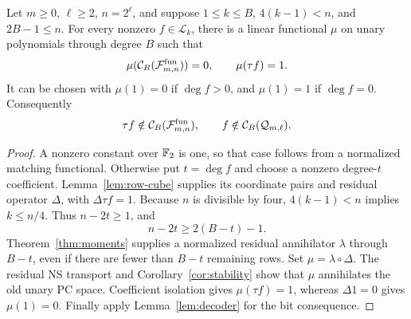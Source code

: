 \begin{theorem}
\label{thm:row-separation}
Let \(m\ge0\), \(\ell\ge2\), \(n=2^\ell\), and suppose
\(1\le k\le B\), \(4(k-1)<n\), and \(2B-1\le n\).
For every nonzero \(f\in\mathcal L_k\), there is a linear functional
\(\mu\) on unary polynomials through degree \(B\) such that
\[
 \mu(\mathcal C_B(\mathcal F^{\mathrm{fun}}_{m,n}))=0,
 \qquad \mu(\tau f)=1.
\]
It can be chosen with \(\mu(1)=0\) if \(\deg f>0\), and
\(\mu(1)=1\) if \(\deg f=0\). Consequently
\[
 \tau f\notin\mathcal C_B(\mathcal F^{\mathrm{fun}}_{m,n}),\qquad
 f\notin\mathcal C_B(\mathcal Q_{m,\ell}).
\]
\end{theorem}
\begin{proof}
A nonzero constant over \(\mathbb F_2\) is one, so that case follows from a
normalized matching functional. Otherwise put \(t=\deg f\) and choose a
nonzero degree-\(t\) coefficient. Lemma~\ref{lem:row-cube} supplies its
coordinate pairs and residual operator \(\Delta\), with \(\Delta\tau f=1\).
Because \(n\) is divisible by four, \(4(k-1)<n\) implies \(k\le n/4\).
Thus \(n-2t\ge1\), and
\[
 n-2t\ge2(B-t)-1.
\]
Theorem~\ref{thm:moments} supplies a normalized residual annihilator
\(\lambda\) through \(B-t\), even if there are fewer than \(B-t\)
remaining rows. Set \(\mu=\lambda\circ\Delta\).
The residual NS transport and Corollary~\ref{cor:stability} show that
\(\mu\) annihilates the old unary PC space. Coefficient isolation gives
\(\mu(\tau f)=1\), whereas \(\Delta1=0\) gives \(\mu(1)=0\).
Finally apply Lemma~\ref{lem:decoder} for the bit consequence.
\end{proof}
